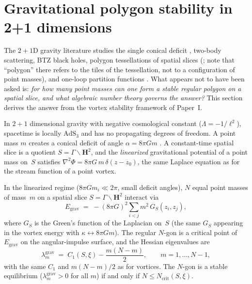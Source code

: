 
\section{Gravitational polygon stability in 2+1 dimensions}
\label{sec:gravity}

The $2{+}1$D gravity literature studies the single
conical deficit \citep{DeserJackiw1984}, two-body scattering,
BTZ black holes, polygon tessellations of spatial slices
(\citealt{tHooft1992}; note that ``polygon'' there refers to
the tiles of the tessellation, not to a configuration of
point masses), and one-loop partition functions
\citep{GiombiMaloneyYin2008}.
What appears not to have been asked is:
\emph{for how many point masses can one form a stable regular
polygon on a spatial slice, and what algebraic number theory
governs the answer?}
This section derives the answer from the vortex stability
framework of Paper~I.

In $2{+}1$ dimensional gravity with negative cosmological
constant ($\Lambda = -1/\ell^2$), spacetime is locally
$\mathrm{AdS}_3$ and has no propagating degrees of freedom.
A point mass $m$ creates a conical deficit of angle
$\alpha = 8\pi G m$ \citep{DeserJackiw1984}.
A constant-time spatial slice is a quotient
$S = \Gamma\backslash\mathbf{H}^2$, and the
\emph{linearized} gravitational potential of a point mass
on~$S$ satisfies $\nabla^2 \Phi = 8\pi G\,m\,\delta(z - z_0)$, the same Laplace equation as for the stream function of a
point vortex.

\begin{proposition}
\label{prop:grav-stability}
In the linearized regime ($8\pi G m_i \ll 2\pi$, small
deficit angles), $N$ equal point masses of mass~$m$ on a
spatial slice $S = \Gamma\backslash\mathbf{H}^2$ interact via
\begin{equation}\label{eq:grav-interaction}
  E_{\mathrm{grav}} \;=\; -(8\pi G)^2\!\sum_{i < j} m^2\,
  G_S(z_i, z_j),
\end{equation}
where $G_S$ is the Green's function of the Laplacian on~$S$
(the same $G_S$ appearing in the vortex energy with
$\kappa \leftrightarrow 8\pi Gm$).
The regular $N$-gon is a critical point of $E_{\mathrm{grav}}$
on the angular-impulse surface, and the Hessian eigenvalues
are
\begin{equation}\label{eq:grav-havelock}
  \lambda_m^{\mathrm{grav}}
  \;=\; C_1(S, \xi) - \frac{m(N{-}m)}{2},
  \qquad m = 1, \ldots, N{-}1,
\end{equation}
with the same $C_1$ and $m(N{-}m)/2$ as for vortices.
The $N$-gon is a stable equilibrium
($\lambda_m^{\mathrm{grav}} > 0$ for all $m$) if and only
if $N \le N_{\mathrm{crit}}(S, \xi)$.
\end{proposition}

